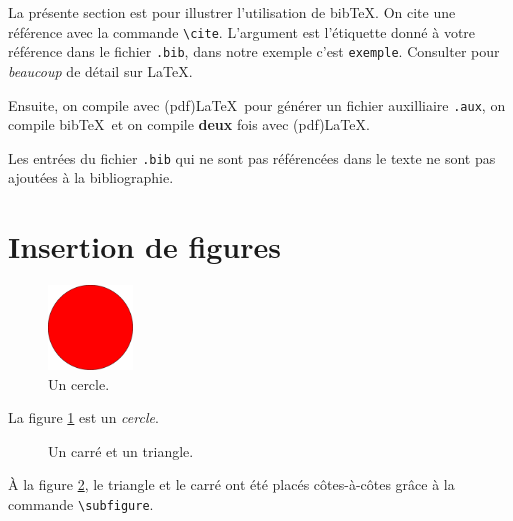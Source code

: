 \documentclass[12pt,twoside,maitrise]{dms}
\theoremstyle{definition}
\numberwithin{equation}{section}
\numberwithin{table}{chapter}
\numberwithin{figure}{chapter}
\begin{document}
La présente section est pour illustrer l'utilisation de
bib\TeX. On cite une référence avec la commande \verb|\cite|.
L'argument est l'étiquette donné à votre référence dans
le fichier \texttt{.bib}, dans notre exemple c'est \texttt{exemple}.
Consulter \cite{exemple} pour \textit{beaucoup} de détail sur \LaTeX.

Ensuite, on compile avec (pdf)\LaTeX\ pour générer un fichier auxilliaire
\texttt{.aux}, on compile bib\TeX\ et on compile \textbf{deux} fois
avec (pdf)\LaTeX.

Les entrées du fichier \verb|.bib| qui ne sont pas référencées
dans le texte ne sont pas ajoutées à la bibliographie.

\section{Insertion de figures}


\begin{figure}[t]
	\centering
	\includegraphics[width=0.2\textwidth]{figures/cercle.pdf}
	\caption{Un cercle.}
	\label{fig:Cercle}
\end{figure}
La figure \ref{fig:Cercle} est un \emph{cercle}.
\begin{figure}[t]
	\centering
	\hspace{2cm}
	\caption{\label{fig:TriCar}Un carré et un triangle.}
\end{figure}
À la figure \ref{fig:TriCar}, le triangle  et le carré  ont été placés côtes-à-côtes grâce à la commande \verb|\subfigure|.
\end{document}
